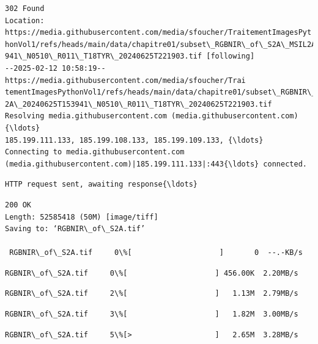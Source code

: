 \documentclass[11pt]{article}
\begin{document}
    \begin{Verbatim}[commandchars=\\\{\}]
302 Found
Location: https://media.githubusercontent.com/media/sfoucher/TraitementImagesPyt
honVol1/refs/heads/main/data/chapitre01/subset\_RGBNIR\_of\_S2A\_MSIL2A\_20240625T153
941\_N0510\_R011\_T18TYR\_20240625T221903.tif [following]
--2025-02-12 10:58:19--  https://media.githubusercontent.com/media/sfoucher/Trai
tementImagesPythonVol1/refs/heads/main/data/chapitre01/subset\_RGBNIR\_of\_S2A\_MSIL
2A\_20240625T153941\_N0510\_R011\_T18TYR\_20240625T221903.tif
Resolving media.githubusercontent.com (media.githubusercontent.com){\ldots}
185.199.111.133, 185.199.108.133, 185.199.109.133, {\ldots}
Connecting to media.githubusercontent.com
(media.githubusercontent.com)|185.199.111.133|:443{\ldots} connected.
    \end{Verbatim}

    \begin{Verbatim}[commandchars=\\\{\}]
HTTP request sent, awaiting response{\ldots}
    \end{Verbatim}

    \begin{Verbatim}[commandchars=\\\{\}]
200 OK
Length: 52585418 (50M) [image/tiff]
Saving to: ‘RGBNIR\_of\_S2A.tif’

 RGBNIR\_of\_S2A.tif     0\%[                    ]       0  --.-KB/s
    \end{Verbatim}

    \begin{Verbatim}[commandchars=\\\{\}]
 RGBNIR\_of\_S2A.tif     0\%[                    ] 456.00K  2.20MB/s
    \end{Verbatim}

    \begin{Verbatim}[commandchars=\\\{\}]
 RGBNIR\_of\_S2A.tif     2\%[                    ]   1.13M  2.79MB/s
    \end{Verbatim}

    \begin{Verbatim}[commandchars=\\\{\}]
 RGBNIR\_of\_S2A.tif     3\%[                    ]   1.82M  3.00MB/s
    \end{Verbatim}

    \begin{Verbatim}[commandchars=\\\{\}]
 RGBNIR\_of\_S2A.tif     5\%[>                   ]   2.65M  3.28MB/s
    \end{Verbatim}
\end{document}
